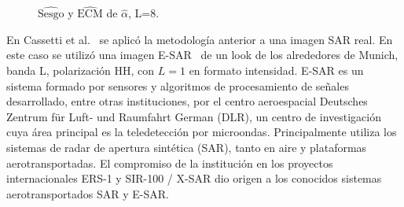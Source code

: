 \begin{figure}[htb]
	\centering
	\caption{\small $\widehat{\text{Sesgo}}$ y $\widehat{\text{ECM}}$ de $\widehat{\alpha}$, L=$8$.}
\end{figure}

En Cassetti et al.~\cite{APSAR2013ParameterEstimationStochasticDistances} se aplicó la metodología anterior a una imagen SAR real. En este caso se utilizó una imagen E-SAR~\cite{Horn1996} de un look de los alrededores de Munich, banda L, polarización HH, con $L=1$ en formato intensidad.
E-SAR es un sistema formado por sensores y algoritmos de procesamiento de señales desarrollado, entre otras instituciones, por el centro aeroespacial Deutsches Zentrum für Luft- und Raumfahrt German (DLR), un centro de investigación cuya área principal es la teledetección por microondas.  Principalmente utiliza los sistemas de radar de apertura sintética (SAR), tanto en aire y plataformas aerotransportadas. El compromiso de la institución en los proyectos internacionales ERS-1 y SIR-100 / X-SAR dio origen a los conocidos sistemas aerotransportados SAR y E-SAR. 

